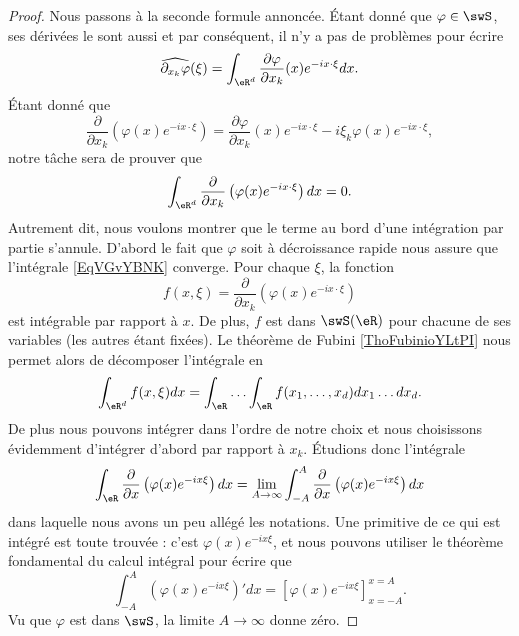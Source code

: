 \begin{proof}
    Nous passons à la seconde formule annoncée. Étant donné que \( \varphi\in\swS\), ses dérivées le sont aussi et par conséquent, il n'y a pas de problèmes pour écrire
    \begin{equation}    \label{EqTYizlnia}
        \widehat{\partial_{x_k}\varphi}(\xi)=\int_{\eR^d}\frac{ \partial \varphi }{ \partial x_k }(x) e^{-ix\cdot \xi}dx.
    \end{equation}
    Étant donné que
    \begin{equation}    \label{EqZAeYaCB}
        \frac{ \partial  }{ \partial x_k }\left( \varphi(x) e^{-ix\cdot\xi} \right)=\frac{ \partial \varphi }{ \partial x_k }(x) e^{-ix\cdot\xi}-i\xi_k\varphi(x) e^{-ix\cdot \xi},
    \end{equation}
    notre tâche sera de prouver que
    \begin{equation}    \label{EqVGvYBNK}
        \int_{\eR^d}\frac{ \partial  }{ \partial x_k }\left( \varphi(x) e^{-ix\cdot \xi} \right)dx=0.
    \end{equation}
    Autrement dit, nous voulons montrer que le terme au bord d'une intégration par partie s'annule. D'abord le fait que \( \varphi\) soit à décroissance rapide nous assure que l'intégrale \eqref{EqVGvYBNK} converge. Pour chaque \( \xi\), la fonction
    \begin{equation}
        f(x,\xi)=\frac{ \partial}{\partial x_k }\left( \varphi(x) e^{-ix\cdot \xi} \right)
    \end{equation}
    est intégrable par rapport à \( x\). De plus, \( f\) est dans \( \swS(\eR)\) pour chacune de ses variables (les autres étant fixées). Le théorème de Fubini \ref{ThoFubinioYLtPI} nous permet alors de décomposer l'intégrale en
    \begin{equation}
        \int_{\eR^d}f(x,\xi)dx=\int_{\eR}\ldots\int_{\eR} f(x_1,\ldots, x_d)dx_1\ldots dx_d.
    \end{equation}
    De plus nous pouvons intégrer dans l'ordre de notre choix et nous choisissons évidemment d'intégrer d'abord par rapport à \( x_k\).  Étudions donc l'intégrale
    \begin{equation}
        \int_{\eR}\frac{ \partial  }{ \partial x }\left( \varphi(x) e^{-ix\xi} \right)dx=\lim_{A\to\infty}\int_{-A}^A\frac{ \partial  }{ \partial x }\left( \varphi(x) e^{-ix\xi} \right)dx
    \end{equation}
    dans laquelle nous avons un peu allégé les notations. Une primitive de ce qui est intégré est toute trouvée : c'est \( \varphi(x) e^{-ix\xi}\), et nous pouvons utiliser le théorème fondamental du calcul intégral pour écrire que
    \begin{equation}
        \int_{-A}^A\left( \varphi(x) e^{-ix\xi} \right)'dx=\left[ \varphi(x) e^{-ix\xi} \right]_{x=-A}^{x=A}.
    \end{equation}
    Vu que \( \varphi\) est dans \( \swS\), la limite \( A\to\infty\) donne zéro.


\end{proof}

